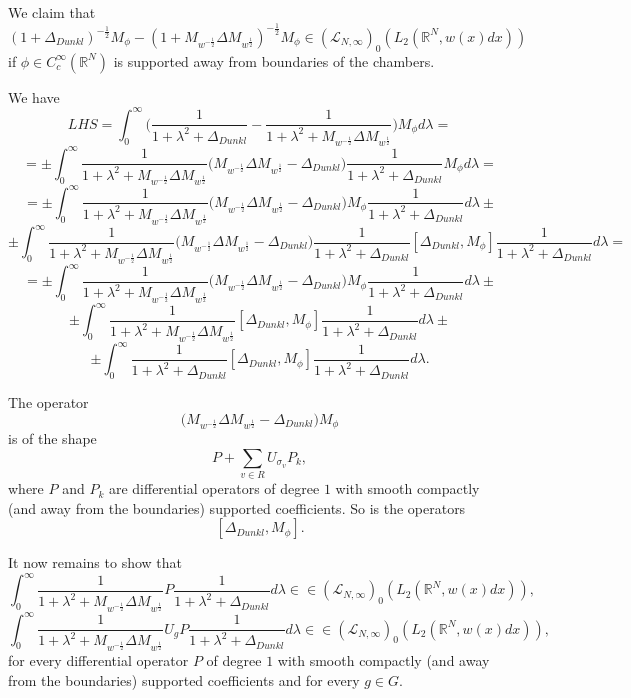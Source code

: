 \documentclass{amsart}
\begin{document}
We claim that
$$(1+\Delta_{Dunkl})^{-\frac12}M_{\phi}-(1+M_{w^{-\frac12}}\Delta M_{w^{\frac12}})^{-\frac12}M_{\phi}\in(\mathcal{L}_{N,\infty})_0(L_2(\mathbb{R}^N,w(x)dx))$$
if $\phi\in C^{\infty}_c(\mathbb{R}^N)$ is supported away from boundaries of the chambers.

We have
$$LHS=\int_0^{\infty}\Big(\frac1{1+\lambda^2+\Delta_{Dunkl}}-\frac1{1+\lambda^2+M_{w^{-\frac12}}\Delta M_{w^{\frac12}}}\Big)M_{\phi}d\lambda=$$
$$=\pm\int_0^{\infty}\frac1{1+\lambda^2+M_{w^{-\frac12}}\Delta M_{w^{\frac12}}}\Big(M_{w^{-\frac12}}\Delta M_{w^{\frac12}}-\Delta_{Dunkl}\Big)\frac1{1+\lambda^2+\Delta_{Dunkl}}M_{\phi}d\lambda=$$
$$=\pm\int_0^{\infty}\frac1{1+\lambda^2+M_{w^{-\frac12}}\Delta M_{w^{\frac12}}}\Big(M_{w^{-\frac12}}\Delta M_{w^{\frac12}}-\Delta_{Dunkl}\Big)M_{\phi}\frac1{1+\lambda^2+\Delta_{Dunkl}}d\lambda\pm$$
$$\pm\int_0^{\infty}\frac1{1+\lambda^2+M_{w^{-\frac12}}\Delta M_{w^{\frac12}}}\Big(M_{w^{-\frac12}}\Delta M_{w^{\frac12}}-\Delta_{Dunkl}\Big)\frac1{1+\lambda^2+\Delta_{Dunkl}}[\Delta_{Dunkl},M_{\phi}]\frac1{1+\lambda^2+\Delta_{Dunkl}}d\lambda=$$
$$=\pm\int_0^{\infty}\frac1{1+\lambda^2+M_{w^{-\frac12}}\Delta M_{w^{\frac12}}}\Big(M_{w^{-\frac12}}\Delta M_{w^{\frac12}}-\Delta_{Dunkl}\Big)M_{\phi}\frac1{1+\lambda^2+\Delta_{Dunkl}}d\lambda\pm$$
$$\pm\int_0^{\infty}\frac1{1+\lambda^2+M_{w^{-\frac12}}\Delta M_{w^{\frac12}}}[\Delta_{Dunkl},M_{\phi}]\frac1{1+\lambda^2+\Delta_{Dunkl}}d\lambda\pm$$
$$\pm\int_0^{\infty}\frac1{1+\lambda^2+\Delta_{Dunkl}}[\Delta_{Dunkl},M_{\phi}]\frac1{1+\lambda^2+\Delta_{Dunkl}}d\lambda.$$

The operator
$$\Big(M_{w^{-\frac12}}\Delta M_{w^{\frac12}}-\Delta_{Dunkl}\Big)M_{\phi}$$
is of the shape
$$P+\sum_{v\in R}U_{\sigma_v}P_k,$$
where $P$ and $P_k$ are differential operators of degree $1$ with smooth compactly (and away from the boundaries) supported coefficients. So is the operators
$$[\Delta_{Dunkl},M_{\phi}].$$

It now remains to show that
$$\int_0^{\infty}\frac1{1+\lambda^2+M_{w^{-\frac12}}\Delta M_{w^{\frac12}}}P\frac1{1+\lambda^2+\Delta_{Dunkl}}d\lambda\in \in(\mathcal{L}_{N,\infty})_0(L_2(\mathbb{R}^N,w(x)dx)),$$
$$\int_0^{\infty}\frac1{1+\lambda^2+M_{w^{-\frac12}}\Delta M_{w^{\frac12}}}U_gP\frac1{1+\lambda^2+\Delta_{Dunkl}}d\lambda\in \in(\mathcal{L}_{N,\infty})_0(L_2(\mathbb{R}^N,w(x)dx)),$$
for every differential operator $P$ of degree $1$ with smooth compactly (and away from the boundaries) supported  coefficients and for every $g\in G.$
\end{document}
